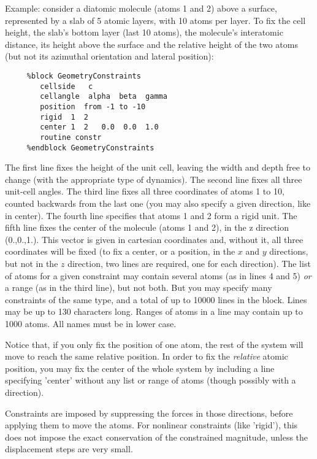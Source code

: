 \begin{description}
\begin{itemize}
\end{itemize}

Example: consider a diatomic molecule (atoms 1 and 2) above a surface, 
represented by a slab of 5 atomic layers, with 10 atoms per layer.
To fix the cell height, the slab's bottom layer (last 10 atoms),
the molecule's interatomic distance, its height above the surface and
the relative height of the two atoms
(but not its azimuthal orientation and lateral position):

\begin{verbatim}
     %block GeometryConstraints
        cellside   c 
        cellangle  alpha  beta  gamma
        position  from -1 to -10
        rigid  1  2
        center 1  2   0.0  0.0  1.0
        routine constr
     %endblock GeometryConstraints
\end{verbatim}

The first line fixes the height of the unit cell, leaving the
width and depth free to change (with the appropriate type of dynamics). 
The second line fixes all three unit-cell angles. 
The third line fixes all three coordinates of
atoms 1 to 10, counted backwards from the last one
(you may also specify a given direction, like in center).
The fourth line specifies that atoms 1 and 2 form a rigid unit.
The fifth line fixes the center of the molecule (atoms 1 and 2),
in the z direction (0.,0.,1.). This vector is given in cartesian 
coordinates and, without it, all three coordinates will be
fixed (to fix a center, or a position, in the $x$ and $y$ directions,
but not in the $z$ direction, two lines are required, one for each
direction). 
The list of atoms for a given constraint may contain several atoms
(as in lines 4 and 5) {\it or} a range (as in the third line),
but not both. But you may specify many constraints of the same type,
and a total of up to 10000 lines in the block.
Lines may be up to 130 characters long. Ranges of atoms in a line
may contain up to 1000 atoms. All names must be in lower case.

Notice that, if you only fix the position of one atom, the rest of the
system will move to reach the same relative position. In order to
fix the {\it relative} atomic position, you may fix the center of
the whole system by including a line specifying 'center'
without any list or range of atoms (though possibly with a direction).

Constraints are imposed by suppressing the forces in those directions,
before applying them to move the atoms. For nonlinear constraints
(like 'rigid'), this does not impose the exact conservation of the 
constrained magnitude, unless the displacement steps are very small.


\end{description}
